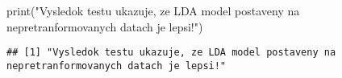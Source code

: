 \documentclass[
]{article}
\newenvironment{Shaded}{\begin{snugshade}}{\end{snugshade}}
\newcommand{\FunctionTok}[1]{\textcolor[rgb]{0.00,0.00,0.00}{#1}}
\newcommand{\NormalTok}[1]{#1}
\newcommand{\StringTok}[1]{\textcolor[rgb]{0.31,0.60,0.02}{#1}}
\begin{document}
\begin{Shaded}
\begin{Highlighting}[]
\FunctionTok{print}\NormalTok{(}\StringTok{"Vysledok testu ukazuje, ze LDA model postaveny na nepretranformovanych datach je lepsi!"}\NormalTok{)}
\end{Highlighting}
\end{Shaded}

\begin{verbatim}
## [1] "Vysledok testu ukazuje, ze LDA model postaveny na nepretranformovanych datach je lepsi!"
\end{verbatim}
\end{document}

